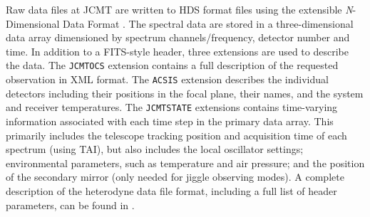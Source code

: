 \documentclass[a4paper,fleqn,usenatbib]{mnras}
\newcommand{\ascl}[1]{\href{http://www.ascl.net/#1}{ascl:#1}}
\begin{document}
Raw data files at JCMT are written to HDS format files
\citep[e.g.,][\ascl{1502.009}]{2015HDS} using the extensible \emph{N}-Dimensional
Data Format \citep[NDF;][\ascl{1411.023}]{2015NDF}. The spectral data are stored in a
three-dimensional data array dimensioned by spectrum channels/frequency, detector
number and time. In addition to a FITS-style header, three extensions
are used to describe the data. The \texttt{JCMTOCS} extension contains
a full description of the requested observation in XML format. The
\texttt{ACSIS} extension describes the individual detectors including
their positions in the focal plane, their names, and the system and
receiver temperatures. The \texttt{JCMTSTATE} extensions contains
time-varying information associated with each time step in the primary
data array. This primarily includes the telescope tracking position
and acquisition time of each spectrum (using TAI), but also includes
the local oscillator settings; environmental parameters, such as
temperature and air pressure; and the position of the secondary mirror
(only needed for jiggle observing modes).  A complete description of
the heterodyne data file format, including a full list of header
parameters, can be found in \citet{OCS_ICD_022}.





\bsp	%
\label{lastpage}
\end{document}
